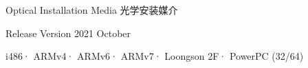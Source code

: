     {
        
        \hspace{1pt}\vspace{240pt}
        
        \vfill

        \hfill{\Huge{}\bfseries\fontsize{50pt}{60pt}\selectfont\doctitleA}

        \vspace{10pt}

        \vspace{15pt}
        \hfill{
            \sffamily
            \Large
            Optical Installation Media\hspace{8pt} 光学安装媒介
        }
        
        \vspace{70pt}
        \large
        \hfill{\sffamily Release Version 2021 October}



        \vspace{15pt}
        \mdseries
        \sffamily

        \hfill
        {i486}\hspace{3pt}·\hspace{3pt}
        {ARMv4}\hspace{3pt}·\hspace{3pt}
        {ARMv6}\hspace{3pt}·\hspace{3pt}
        {ARMv7}\hspace{3pt}·\hspace{3pt}
        {Loongson 2F}\hspace{3pt}·\hspace{3pt}
        {PowerPC (32/64)}

    }

